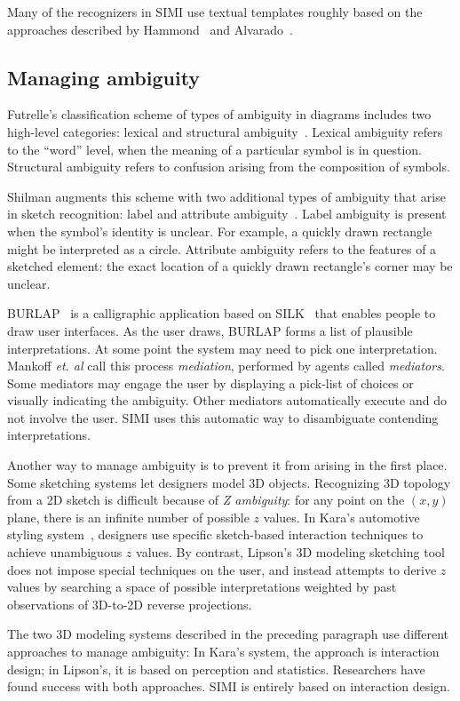 Many of the recognizers in SIMI use textual templates roughly based on
the approaches described by Hammond~\cite{hammond-ladder} and
Alvarado~\cite[Chapter 4]{alvarado-phd-thesis}.

\subsection{Managing ambiguity}
\label{sec:recognition-managing-ambiguity}

Futrelle's classification scheme of types of ambiguity in diagrams
includes two high-level categories: lexical and structural
ambiguity~\cite{futrelle-ambigutiy}. Lexical ambiguity refers to the
``word'' level, when the meaning of a particular symbol is in
question. Structural ambiguity refers to confusion arising from the
composition of symbols.

Shilman augments this scheme with two additional types of ambiguity
that arise in sketch recognition: label and attribute
ambiguity~\cite{shilman-parsing}. Label ambiguity is present when the
symbol's identity is unclear. For example, a quickly drawn rectangle
might be interpreted as a circle. Attribute ambiguity refers to the
features of a sketched element: the exact location of a quickly drawn
rectangle's corner may be unclear.

BURLAP~\cite{mankoff-burlap} is a calligraphic application based on
SILK~\cite{landay-silk} that enables people to draw user
interfaces. As the user draws, BURLAP forms a list of plausible
interpretations. At some point the system may need to pick one
interpretation. Mankoff \textit{et. al} call this process
\textit{mediation}, performed by agents called
\textit{mediators}. Some mediators may engage the user by displaying a
pick-list of choices or visually indicating the ambiguity. Other
mediators automatically execute and do not involve the user. SIMI
uses this automatic way to disambiguate contending interpretations.

Another way to manage ambiguity is to prevent it from arising in the
first place. Some sketching systems let designers model 3D
objects. Recognizing 3D topology from a 2D sketch is difficult because
of \textit{Z ambiguity}: for any point on the $(x, y)$ plane, there is
an infinite number of possible $z$ values. In Kara's automotive
styling system~\cite{kara-3d-styling}, designers use specific
sketch-based interaction techniques to achieve unambiguous $z$
values. By contrast, Lipson's 3D modeling sketching
tool~\cite{lipson-correlation} does not impose special techniques on
the user, and instead attempts to derive $z$ values by searching a
space of possible interpretations weighted by past observations of
3D-to-2D reverse projections.

The two 3D modeling systems described in the preceding paragraph use
different approaches to manage ambiguity: In Kara's system, the
approach is interaction design; in Lipson's, it is based on perception
and statistics. Researchers have found success with both
approaches. SIMI is entirely based on interaction design.

